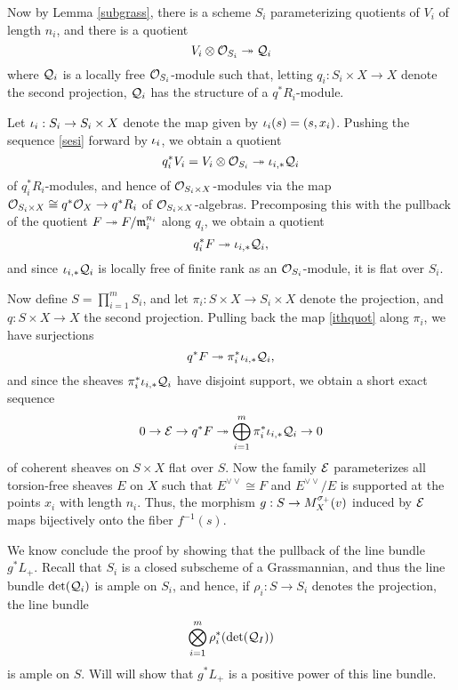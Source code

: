 \documentclass[letterpaper,12pt]{amsart}
\theoremstyle{remark}
\begin{document}
Now by Lemma \ref{subgrass}, there is a scheme $S_i$ parameterizing quotients of $V_i$ of length $n_i$, and there is a quotient
\begin{equation}\label{sesi}
    V_i \otimes \mathcal{O}_{S_i} \twoheadrightarrow \mathcal{Q}_i
\end{equation} 
where $\mathcal{Q}_i$ is a locally free $\mathcal{O}_{S_i}$-module such that, letting $q_i: S_i \times X \to X$ denote the second projection, $\mathcal{Q}_i$ has the structure of a $q^* R_i$-module. 

Let $\iota_i: S_i \to S_i \times X$ denote the map given by $\iota_i(s) = (s, x_i)$. Pushing the sequence \eqref{sesi} forward by $\iota_i$, we obtain a quotient
\[ q_i^* V_i = V_i \otimes \mathcal{O}_{S_i} \twoheadrightarrow \iota_{i,*} \mathcal{Q}_i \]
of $q_i^* R_i$-modules, and hence of $\mathcal{O}_{S_i\times X}$-modules via the map $\mathcal{O}_{S_i \times X} \cong q^* \mathcal{O}_X \to q^*R_i$ of $\mathcal{O}_{S_i \times X}$-algebras. Precomposing this with the pullback of the quotient $F \twoheadrightarrow F/\mathfrak{m}_i^{n_i}$ along $q_i$, we obtain a quotient
\begin{equation}\label{ithquot}
    q_i^*F \twoheadrightarrow \iota_{i,*} \mathcal{Q}_i,
\end{equation}
and since $\iota_{i,*} \mathcal{Q}_i$ is locally free of finite rank as an $\mathcal{O}_{S_i}$-module, it is flat over $S_i$.

Now define $S = \prod_{i=1}^m S_i$, and let $\pi_i: S \times X \to S_i \times X$ denote the projection, and $q: S \times X \to X$ the second projection. Pulling back the map \eqref{ithquot} along $\pi_i$, we have surjections 
\[ q^* F \twoheadrightarrow \pi_i^* \iota_{i,*}\mathcal{Q}_i, \]
and since the sheaves $\pi_i^* \iota_{i,*}\mathcal{Q}_i$ have disjoint support, we obtain a short exact sequence
\begin{equation}\label{bigquotient}
    0 \to \mathcal{E} \to q^* F \twoheadrightarrow \bigoplus_{i=1}^m \pi_i^* \iota_{i,*}\mathcal{Q}_i \to 0
\end{equation}
of coherent sheaves on $S \times X$ flat over $S$. Now the family $\mathcal{E}$ parameterizes all torsion-free sheaves $E$ on $X$ such that $E^{\vee\vee} \cong F$ and $E^{\vee\vee}/E$ is supported at the points $x_i$ with length $n_i$. Thus, the morphism $g: S \to M^{\sigma_+}_X(v)$ induced by $\mathcal{E}$ maps bijectively onto the fiber $f^{-1}(s)$.

We know conclude the proof by showing that the pullback of the line bundle $g^* L_+$. Recall that $S_i$ is a closed subscheme of a Grassmannian, and thus the line bundle $\det(\mathcal{Q}_i)$ is ample on $S_i$, and hence, if $\rho_i: S \to S_i$ denotes the projection, the line bundle
\[ \bigotimes_{i=1}^m \rho_i^*(\det(\mathcal{Q}_I)) \]
is ample on $S$. Will will show that $g^*L_+$ is a positive power of this line bundle.
\end{document}
